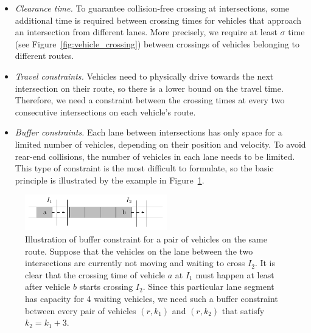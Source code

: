 \documentclass{article}
\theoremstyle{definition}
\theoremstyle{plain}
\begin{document}
\begin{itemize}
  \item \textit{Clearance time.} To guarantee collision-free crossing at
        intersections, some additional time is required between crossing times
        for vehicles that approach an intersection from different lanes. More
        precisely, we require at least $\sigma$ time (see
        Figure~\ref{fig:vehicle_crossing}) between crossings of vehicles
        belonging to different routes.

  \item \textit{Travel constraints.} Vehicles need to physically drive towards
        the next intersection on their route, so there is a lower bound on
        the travel time. Therefore, we need a constraint between the crossing
        times at every two consecutive intersections on each vehicle's route.

  \item \textit{Buffer constraints.} Each lane between intersections has only
        space for a limited number of vehicles, depending on their position and
        velocity. To avoid rear-end collisions, the number of vehicles in each
        lane needs to be limited.
        This type of constraint is the most difficult to formulate, so the basic
        principle is illustrated by the example in
        Figure~\ref{fig:buffer_constraints}.
\end{itemize}

\begin{figure}[h]
  \centering
  \includegraphics[width=0.55\textwidth]{figures/buffer_constraints.pdf}
  \caption{Illustration of buffer constraint for a pair of vehicles on the same
    route. Suppose that the vehicles on the lane between the two intersections
    are currently not moving and waiting to cross $I_{2}$. It is clear that the
    crossing time of vehicle $a$ at $I_{1}$ must happen at least after
    vehicle $b$ starts crossing $I_{2}$. Since this particular lane segment has
    capacity for 4 waiting vehicles, we need such a buffer constraint between
    every pair of vehicles $(r,k_{1})$ and $(r,k_{2})$ that satisfy
    $k_{2} = k_{1} + 3$.}
  \label{fig:buffer_constraints}
  \end{figure}

\end{document}
